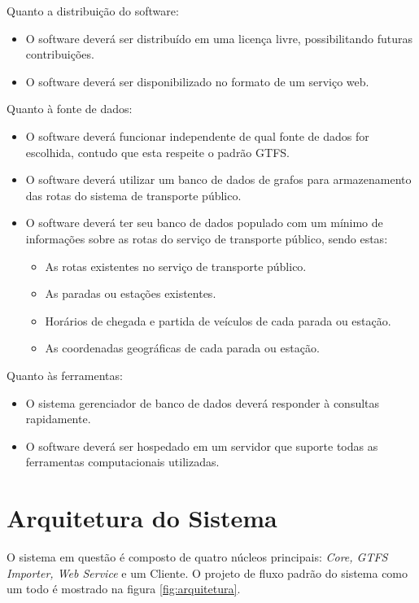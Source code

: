 Quanto a distribuição do software:
\begin{itemize}
	\item O software deverá ser distribuído em uma licença livre, possibilitando futuras contribuições.
	\item O software deverá ser disponibilizado no formato de um serviço web.
\end{itemize}

Quanto à fonte de dados:
\begin{itemize}
	\item O software deverá funcionar independente de qual fonte de dados for escolhida, contudo que esta respeite o padrão GTFS.
	\item O software deverá utilizar um banco de dados de grafos para armazenamento das rotas do sistema de transporte público.
	\item O software deverá ter seu banco de dados populado com um mínimo de informações sobre as rotas do serviço de transporte público, sendo estas:
	\begin{itemize}
		\item As rotas existentes no serviço de transporte público.
		\item As paradas ou estações existentes.
		\item Horários de chegada e partida de veículos de cada parada ou estação.
		\item As coordenadas geográficas de cada parada ou estação.
	\end{itemize}
\end{itemize}

Quanto às ferramentas:
\begin{itemize}
	\item O sistema gerenciador de banco de dados deverá responder à consultas rapidamente.
	\item O software deverá ser hospedado em um servidor que suporte todas as ferramentas computacionais utilizadas.
\end{itemize}


\section{Arquitetura do Sistema}
O sistema em questão é composto de quatro núcleos principais: \emph{Core, GTFS Importer, Web Service} e um Cliente. 
O projeto de fluxo padrão do sistema como um todo é mostrado na figura \ref{fig:arquitetura}.

